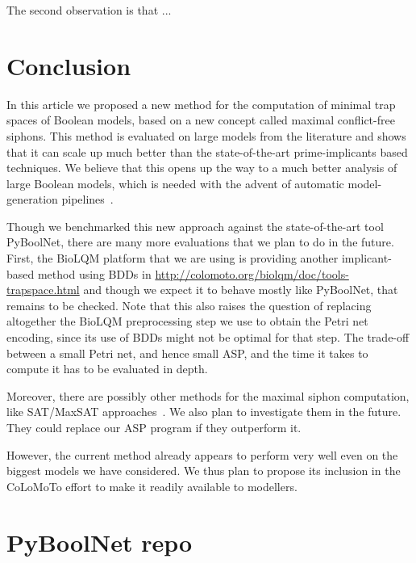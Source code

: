 \documentclass[runningheads]{llncs}
\begin{document}
The second observation is that ...

\section{Conclusion}

In this article we proposed a new method for the computation of minimal trap spaces of Boolean models, based on a new concept called maximal conflict-free siphons.
This method is evaluated on large models from the literature and shows that it can scale up much better than the state-of-the-art prime-implicants based techniques.
We believe that this opens up the way to a much better analysis of large Boolean models, which is needed with the advent of automatic model-generation pipelines~\cite{ostaszewski2021covid19}.

Though we benchmarked this new approach against the state-of-the-art tool PyBoolNet, there are many more evaluations that we plan to do in the future.
First, the BioLQM platform that we are using is providing another implicant-based method using BDDs in \url{http://colomoto.org/biolqm/doc/tools-trapspace.html} and though we expect it to behave mostly like PyBoolNet, that remains to be checked.
Note that this also raises the question of replacing altogether the BioLQM preprocessing step we use to obtain the Petri net encoding, since its use of BDDs might not be optimal for that step.
The trade-off between a small Petri net, and hence small ASP, and the time it takes to compute it has to be evaluated in depth.

Moreover, there are possibly other methods for the maximal siphon computation, like SAT/MaxSAT approaches~\cite{nabli2016enumerating}. We also plan to investigate them in the future. They could replace our ASP program if they outperform it.

However, the current method already appears to perform very well even on the biggest models we have considered.
We thus plan to propose its inclusion in the CoLoMoTo effort to make it readily available to modellers.





\appendix

\section{PyBoolNet repo}
\end{document}
